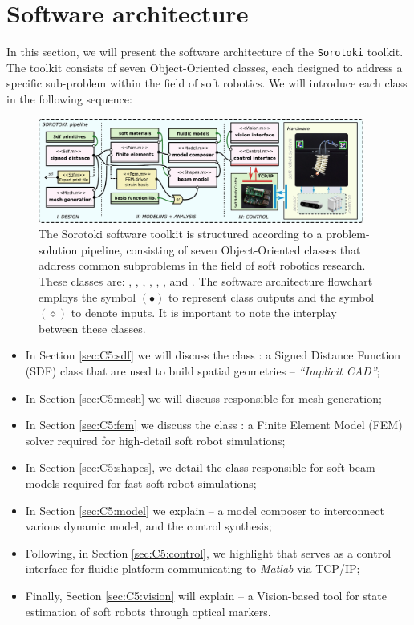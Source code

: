 \section{Software architecture}
\label{sec:C5:software}
In this section, we will present the software architecture of the \texttt{Sorotoki} toolkit. The toolkit consists of seven Object-Oriented classes, each designed to address a specific sub-problem within the field of soft robotics. We will introduce each class in the following sequence:

\begin{figure}
\includegraphics[width=0.955\textwidth]{./pdf/thesis-figure-6-2.pdf}    
\centering
\caption{\small The Sorotoki software toolkit is structured according to a problem-solution pipeline, consisting of seven Object-Oriented classes that address common subproblems in the field of soft robotics research. These classes are: , , , , , , and . The software architecture flowchart employs the symbol $(\bullet)$ to represent class outputs and the symbol $(\diamond)$ to denote inputs. It is important to note the interplay between these classes. \label{fig:C5:softwareArchitecture}}
\end{figure}
%
\begin{itemize}
    \setlength\itemsep{0.0em}
    \item In Section \ref{sec:C5:sdf} we will discuss the class : a Signed Distance Function (SDF) class that are used to build spatial geometries --  \emph{``Implicit CAD''};
    \item In Section \ref{sec:C5:mesh} we will discuss  responsible for mesh generation;
    \item In Section \ref{sec:C5:fem} we discuss the class : a Finite Element Model (FEM) solver required for high-detail soft robot simulations;
    \item In Section \ref{sec:C5:shapes}, we detail the class  responsible for soft beam models required for fast soft robot simulations;
    \item In Section \ref{sec:C5:model} we explain  -- a model composer to interconnect various dynamic model, and the control synthesis;
    \item Following, in Section \ref{sec:C5:control}, we highlight  that serves as a control interface for fluidic platform communicating to \textit{Matlab} via TCP/IP;
    \item Finally, Section \ref{sec:C5:vision} will explain  -- a Vision-based tool for state estimation of soft robots through optical markers.
\end{itemize}
